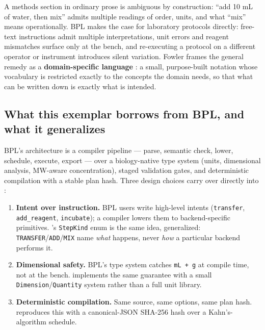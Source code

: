 \documentclass[
  english,
]{article}
\providecommand{\tightlist}{%
  \setlength{\itemsep}{0pt}\setlength{\parskip}{0pt}}
\begin{document}
A methods section in ordinary prose is ambiguous by construction: ``add
10 mL of water, then mix'' admits multiple readings of order, units, and
what ``mix'' means operationally. BPL \citep{bpl2026} makes the case for
laboratory protocols directly: free-text instructions admit multiple
interpretations, unit errors and reagent mismatches surface only at the
bench, and re-executing a protocol on a different operator or instrument
introduces silent variation. Fowler frames the general remedy as a
\textbf{domain-specific language} \citep{fowler2010dsl}: a small,
purpose-built notation whose vocabulary is restricted exactly to the
concepts the domain needs, so that what can be written down is exactly
what is intended.

\subsection{What this exemplar borrows from BPL, and what it
generalizes}\label{what-this-exemplar-borrows-from-bpl-and-what-it-generalizes}

BPL's architecture is a compiler pipeline --- parse, semantic check,
lower, schedule, execute, export --- over a biology-native type system
(units, dimensional analysis, MW-aware concentration), staged validation
gates, and deterministic compilation with a stable plan hash. Three
design choices carry over directly into :

\begin{enumerate}
\def\labelenumi{\arabic{enumi}.}
\tightlist
\item
  \textbf{Intent over instruction.} BPL users write high-level intents
  (\texttt{transfer}, \texttt{add\_reagent}, \texttt{incubate}); a
  compiler lowers them to backend-specific primitives.
  's \texttt{StepKind} enum is
  the same idea, generalized:
  \texttt{TRANSFER}/\texttt{ADD}/\texttt{MIX} name \emph{what} happens,
  never \emph{how} a particular backend performs it.
\item
  \textbf{Dimensional safety.} BPL's type system catches
  \texttt{mL\ +\ g} at compile time, not at the bench.
   implements the same guarantee with
  a small \texttt{Dimension}/\texttt{Quantity} system rather than a full
  unit library.
\item
  \textbf{Deterministic compilation.} Same source, same options, same
  plan hash. 
  reproduces this with a canonical-JSON SHA-256 hash over a
  Kahn's-algorithm \citep{kahn1962topological} schedule.
\end{enumerate}
\end{document}
